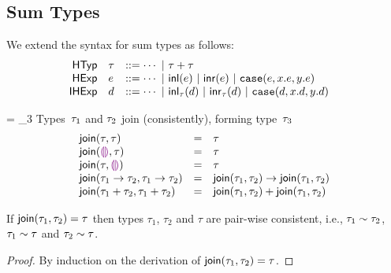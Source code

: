 
\subsection{Sum Types}


We extend the syntax for sum types as follows:
\[
\begin{array}{rllllll}
\mathsf{HTyp} & \tau & ::= \cdots ~\vert~ {\tau + \tau} &
\\
\mathsf{HExp} & e & ::= \cdots
~\vert~ \mathsf{inl}(e)
~\vert~ \mathsf{inr}(e)
~\vert~ \texttt{case}({e},{x}.{e},{y}.{e})
\\
\mathsf{IHExp} & d & ::= \cdots
~\vert~ \mathsf{inl}_{\tau}(d)
~\vert~ \mathsf{inr}_{\tau}(d)
~\vert~ \texttt{case}({d},{x}.{d},{y}.{d})
\end{array}
\]



\judgbox
 { = \htau_3}
 {Types~$\tau_1$ and $\tau_2$ join (consistently), forming type~$\tau_3$}
\[
\begin{array}{lcl}
\textsf{join}(\tau,\tau) &=&  \tau
\\
\textsf{join}(\textcolor{violet}{\llparenthesis}\textcolor{violet}{\rrparenthesis},\tau) &=&  \tau
\\
\textsf{join}(\tau,\textcolor{violet}{\llparenthesis}\textcolor{violet}{\rrparenthesis}) &=&  \tau
\\
\textsf{join}(\tau_1 \rightarrow \tau_2,\tau_1 \rightarrow \tau_2)
&=&
\textsf{join}(\tau_1,\tau_2) \rightarrow \textsf{join}(\tau_1,\tau_2)
\\
\textsf{join}({\tau_1} + {\tau_2},{\tau_1} + {\tau_2})
&=&
{\textsf{join}(\tau_1,\tau_2)} + {\textsf{join}(\tau_1,\tau_2)}
\end{array}
\]

\begin{thm}[Joins]
If $\textsf{join}(\tau_1,\tau_2) = \tau$
%
then types $\tau_1$, $\tau_2$ and $\tau$ are pair-wise consistent, i.e.,
%
$\tau_1 \sim \tau_2$,
$\tau_1 \sim \tau$ and
$\tau_2 \sim \tau$.
\begin{proof}
By induction on the derivation of $\textsf{join}(\tau_1,\tau_2) = \tau$.
\end{proof}
\end{thm}

